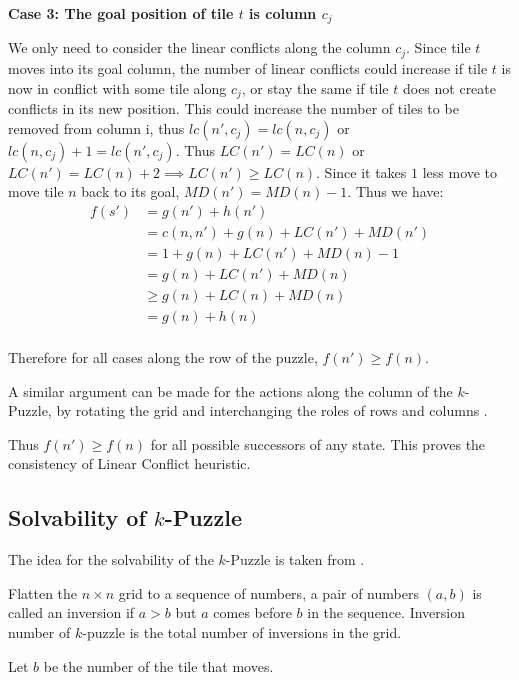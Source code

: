 \documentclass{llncs}
\begin{document}
\textbf{Case 3: The goal position of tile $t$ is column $c_j$}

We only need to consider the linear conflicts along the column $c_j$. Since tile $t$ moves into its goal column, the number of linear conflicts could increase if tile $t$ is now in conflict with some tile along $c_j$, or stay the same if tile $t$ does not create conflicts in its new position. This could increase the number of tiles to be removed from column i, thus $lc(n',c_j) =lc(n,c_j)$ or $lc(n,c_j)+1 = lc(n',c_j)$. Thus $LC(n') = LC(n)$ or $LC(n') = LC(n) + 2 \implies LC(n') \geq LC(n)$. Since it takes $1$ less move to move tile $n$ back to its goal, $MD(n') = MD(n) - 1$. Thus we have:
\begin{align}
    f(s') \nonumber &= g(n') + h(n') \\\nonumber
        &= c(n,n') + g(n) + LC(n') + MD(n') \\\nonumber
        &= 1 + g(n) + LC(n') + MD(n) - 1 \\\nonumber
        &= g(n) + LC(n') + MD(n) \\\nonumber
        &\geq g(n) + LC(n) + MD(n) \\\nonumber
        &= g(n) + h(n) \\\nonumber
\end{align}

Therefore for all cases along the row of the puzzle, $f(n') \geq f(n)$. 

A similar argument can be made for the actions along the column of the $k$-Puzzle, by rotating the grid and interchanging the roles of rows and columns .

Thus $f(n') \geq f(n)$ for all possible successors of any state. This proves the consistency of Linear Conflict heuristic.

\subsection{Solvability of $k$-Puzzle}
The idea for the solvability of the $k$-Puzzle is taken from \cite{solvable}.
\begin{definition}
Flatten the $n \times n$ grid to a sequence of numbers, a pair of numbers $(a,b)$ is called an inversion if $a>b$ but $a$ comes before $b$ in the sequence. Inversion number of $k$-puzzle is the total number of inversions in the grid.
\end{definition}

Let $b$ be the number of the tile that moves.
\end{document}
